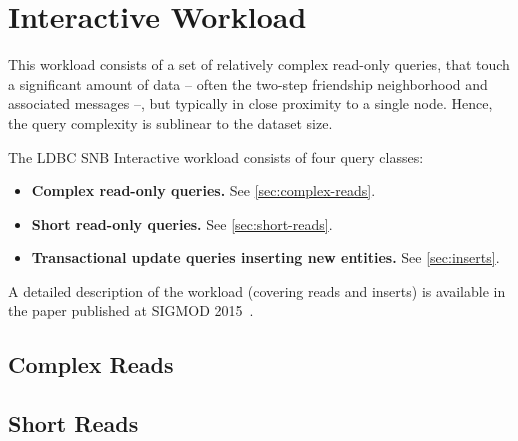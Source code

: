 \chapter{Interactive Workload}
\label{section:interactive}

This workload consists of a set of relatively complex read-only queries, that touch a significant
amount of data -- often the two-step friendship neighborhood and associated messages --, but typically in close proximity to a single node. Hence, the query complexity is sublinear to the dataset size.

The LDBC SNB Interactive workload consists of four query classes:

\begin{itemize}
\item \textbf{Complex read-only queries.} See \autoref{sec:complex-reads}.
\item \textbf{Short read-only queries.} See \autoref{sec:short-reads}.
\item \textbf{Transactional update queries inserting new entities.} See \autoref{sec:inserts}.
\end{itemize}

A detailed description of the workload (covering reads and inserts) is available in the paper published at \mbox{SIGMOD} 2015~\cite{DBLP:conf/sigmod/ErlingALCGPPB15}.


\section{Complex Reads}
\label{sec:complex-reads}




\section{Short Reads}
\label{sec:short-reads}

